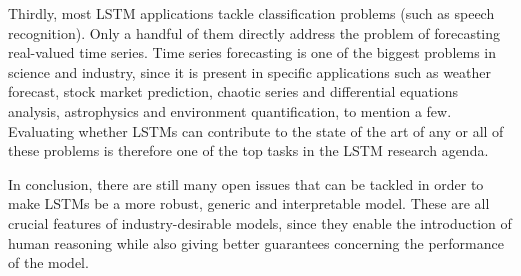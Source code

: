 \documentclass[pdftex,11pt,a4paper]{article}
\theoremstyle{definition}
\theoremstyle{remark}
\begin{document}
\par Thirdly, most LSTM applications tackle classification problems (such as speech recognition). Only a handful of them directly address the problem of forecasting real-valued time series. Time series forecasting is one of the biggest problems in science and industry, since it is present in specific applications such as weather forecast, stock market prediction, chaotic series and differential equations analysis, astrophysics and environment quantification, to mention a few. Evaluating whether LSTMs can contribute to the state of the art of any or all of these problems is therefore one of the top tasks in the LSTM research agenda.

\par In conclusion, there are still many open issues that can be tackled in order to make LSTMs be a more robust, generic and interpretable model. These are all crucial features of industry-desirable models, since they enable the introduction of human reasoning while also giving better guarantees concerning the performance of the model. 



\end{document}
